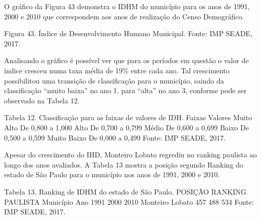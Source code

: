O gráfico da Figura 43 demonstra o IDHM do município para os anos de 1991, 2000 e 2010 que correspondem aos anos de realização do Censo Demográfico.
 
Figura 43. Índice de Desenvolvimento Humano Municipal.
Fonte: IMP SEADE, 2017.

Analisando o gráfico é possível ver que para os períodos em questão o valor de índice cresceu numa taxa média de 19\% entre cada ano. Tal crescimento possibilitou uma transição de classificação para o município, saindo da classificação “muito baixa” no ano 1, para “alta” no ano 3, conforme pode ser observado na  Tabela 12.

Tabela 12. Classificação para as faixas de valores de IDH.
Faixas	Valores
Muito Alto	De 0,800 a 1,000
Alto	De 0,700 a 0,799
Médio	De 0,600 a 0,699
Baixo	De 0,500 a 0,599
Muito Baixo	De 0,000 a 0,499
Fonte: IMP SEADE, 2017.

Apesar do crescimento do IHD, Monteiro Lobato regrediu no ranking paulista ao longo dos anos avaliados. A Tabela 13 mostra a posição segundo Ranking do estado de São Paulo para o município nos anos de 1991, 2000 e 2010.

Tabela 13. Ranking de IDHM do estado de São Paulo.
POSIÇÃO RANKING PAULISTA
Município	Ano
	1991	2000	2010
Monteiro Lobato	457	488	534
Fonte: IMP SEADE, 2017.
